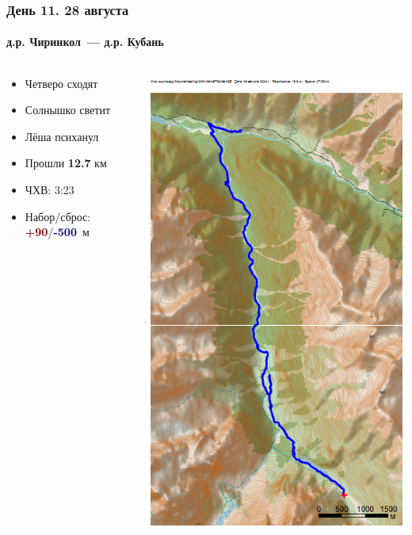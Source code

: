 \begin{frame}
	\frametitle{День 11. 28 августа}
	\framesubtitle{д.р. Чиринкол~--- д.р. Кубань} %
	\begin{columns}[c] %
		\begin{column}{0.55\textwidth} %
			\begin{itemize}
				\item Четверо сходят
				\item Солнышко светит
				\item Лёша психанул
				\item Прошли \textbf{12.7} км
				\item ЧХВ: 3:23
				\item Набор/сброс: \textcolor{darkred}{\textbf{+90}}/\textcolor{darkblue}{\textbf{-500}}~м
			\end{itemize}			
		\end{column}
		\begin{column}{0.45\textwidth} %
			\centering
			\includegraphics[width=\linewidth]{../pics/mini_maps/28}

\end{column}
\end{columns}
\end{frame}
